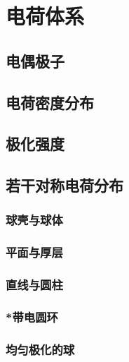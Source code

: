 

\section{电荷体系}\label{10-4}

\subsection{电偶极子}\label{10-4-1}

\subsection{电荷密度分布}\label{10-4-2}

\subsection{极化强度}\label{10-4-3}

\subsection{若干对称电荷分布}\label{10-4-4}

\subsubsection{球壳与球体}\label{10-4-4-1}

\subsubsection{平面与厚层}\label{10-4-4-2}

\subsubsection{直线与圆柱}\label{10-4-4-3}

\subsubsection{*带电圆环}\label{10-4-4-4}

\subsubsection{均匀极化的球}\label{10-4-4-5}